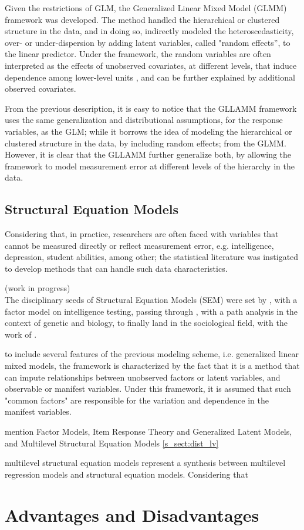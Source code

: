 {Given the restrictions of GLM, the Generalized Linear Mixed Model (GLMM) framework was developed. The method handled the hierarchical or clustered structure in the data, and in doing so, indirectly modeled the heteroscedasticity, over- or under-dispersion by adding latent variables, called "random effects”, to the linear predictor. Under the framework, the random variables are often interpreted as the effects of unobserved covariates, at different levels, that induce dependence among lower-level units \cite{Rabe_et_al_2012}, and can be further explained by additional observed covariates. 

From the previous description, it is easy to notice that the GLLAMM framework uses the same generalization and distributional assumptions, for the response variables, as the GLM; while it borrows the idea of modeling the hierarchical or clustered structure in the data, by including random effects; from the GLMM. However, it is clear that the GLLAMM further generalize both, by allowing the framework to model measurement error at different levels of the hierarchy in the data.



\subsection{Structural Equation Models}

Considering that, in practice, researchers are often faced with variables that cannot be measured directly or reflect measurement error, e.g. intelligence, depression, student abilities, among other; the statistical literature was instigated to develop methods that can handle such data characteristics. 

{\color{red}(work in progress) \\
The disciplinary seeds of Structural Equation Models (SEM) were set by \cite{Spearman_1904}, with a factor model on intelligence testing, passing through \cite{Wright_1920}, with a path analysis in the context of genetic and biology, to finally land in the sociological field, with the work of \cite{Blalock_1961}.

to include several features of the previous modeling scheme, i.e. generalized linear mixed models, the framework is characterized by the fact that it is a method that can impute relationships between unobserved factors or latent variables, and observable or manifest variables. Under this framework, it is assumed that such "common factors" are responsible for the variation and dependence in the manifest variables.

mention Factor Models, Item Response Theory and Generalized Latent Models, and Multilevel Structural Equation Models
\ref{s_sect:dist_lv}


multilevel structural equation models represent a synthesis between multilevel regression models and structural equation models. Considering that 
}


\section{Advantages and Disadvantages}
}